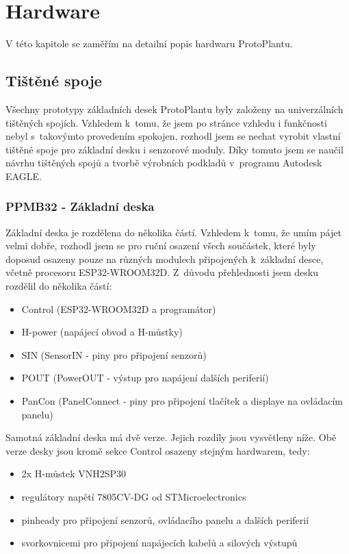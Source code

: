 \chapter{Hardware}
V této kapitole se zaměřím na detailní popis hardwaru ProtoPlantu. 

\section{Tištěné spoje}
Všechny prototypy základních desek ProtoPlantu byly založeny na univerzálních tištěných spojích. Vzhledem k~tomu, že jsem po stránce vzhledu i funkčnosti nebyl s~takovýmto provedením spokojen, rozhodl jsem se nechat vyrobit vlastní tištěné spoje pro základní desku i senzorové moduly.
Díky tomuto jsem se naučil návrhu tištěných spojů a tvorbě výrobních podkladů v~programu Autodesk EAGLE.

\subsection{PPMB32 - Základní deska}
Základní deska je rozdělena do několika částí. 
Vzhledem k~tomu, že umím pájet velmi dobře, rozhodl jsem se pro ruční osazení všech součástek, které byly doposud osazeny pouze na různých modulech připojených k~základní desce, včetně procesoru ESP32-WROOM32D.
Z~důvodu přehlednosti jsem desku rozdělil do několika částí:

\begin{itemize}
    \item Control (ESP32-WROOM32D a programátor)
    \item H-power (napájecí obvod a H-můstky)
    \item SIN (SensorIN - piny pro připojení senzorů)
    \item POUT (PowerOUT - výstup pro napájení dalších periferií)
    \item PanCon (PanelConnect - piny pro připojení tlačítek a displaye na ovládacím panelu)
\end{itemize} 

Samotná základní deska má dvě verze. Jejich rozdíly jsou vysvětleny níže.
Obě verze desky jsou kromě sekce Control osazeny stejným hardwarem, tedy:

\begin{itemize}
    \item 2x H-můstek VNH2SP30
    \item regulátory napětí 7805CV-DG od STMicroelectronics
    \item pinheady pro připojení senzorů, ovládacího panelu a dalších periferií
    \item svorkovnicemi pro připojení napájecích kabelů a silových výstupů
\end{itemize}

